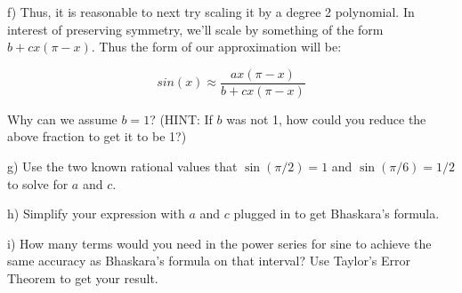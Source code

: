 f) Thus, it is reasonable to next try scaling it by a degree 2 polynomial.  In interest of preserving symmetry, we'll scale by something of the form $b+cx(\pi-x)$.  Thus the form of our approximation will be:

$$ sin(x) \approx \frac{ax(\pi-x)}{b+cx(\pi-x)}$$

Why can we assume $b=1$?  (HINT: If $b$ was not 1, how could you reduce the above fraction to get it to be 1?)

\vspace{2in}

g) Use the two known rational values that $\sin(\pi/2)=1$ and $\sin(\pi/6)=1/2$ to solve for $a$ and $c$.  


\vspace{2in}

h) Simplify your expression with $a$ and $c$ plugged in to get Bhaskara's formula.



\vspace{2in}

i) How many terms would you need in the power series for sine to achieve the same accuracy as Bhaskara's formula on that interval?  Use Taylor's Error Theorem to get your result.


